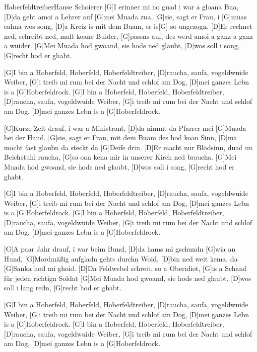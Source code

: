 \documentclass[../main.tex]{subfiles}
\begin{document}
\begin{song}{Haberfeldtreiber}{Hanse Schoierer}{}
[G]I erinner mi no guad i war a gloana Bua, [D]da geht amoi a Lehrer auf [G]mei Muada zua,
[G]sie, sagt er Frau, i [G]muas eahna wos song, [D]a Kreiz is mit dem Buam, er is[G] so ungezogn.
[D]Er rechnet ned, schreibt ned, malt koane Buider, [G]passns auf, des werd amoi a ganz a ganz a wuider.
[G]Mei Muada hod gwoand, sie hods ned glaubt, [D]wos soll i song, [G]recht hod er ghabt.

[G]I bin a Hoberfeld, Hoberfeld, Hoberfeldtreiber, [D]raucha, saufa, vogeldwuide Weiber,
[G]i treib mi rum bei der Nacht und schlof am Dog, [D]mei ganzes Lebn is a [G]Hoberfeldrock.
[G]I bin a Hoberfeld, Hoberfeld, Hoberfeldtreiber, [D]raucha, saufa, vogeldwuide Weiber,
[G]i treib mi rum bei der Nacht und schlof am Dog, [D]mei ganzes Lebn is a [G]Hoberfeldrock.

[G]Kurze Zeit drauf, i war a Ministrant, [D]da nimmt da Pfarrer mei [G]Muada bei der Hand,
[G]sie, sagt er Frau, mit dem Buam des hod koan Sinn, [D]ma möcht fast glaubn da steckt da [G]Deife drin.
[D]Er macht nur Blödsinn, duad im Beichstuhl raucha, [G]so oan kena mir in unserer Kirch ned braucha.
[G]Mei Muada hod gwoand, sie hods ned glaubt, [D]wos soll i song, [G]recht hod er ghabt.

[G]I bin a Hoberfeld, Hoberfeld, Hoberfeldtreiber, [D]raucha, saufa, vogeldwuide Weiber,
[G]i treib mi rum bei der Nacht und schlof am Dog, [D]mei ganzes Lebn is a [G]Hoberfeldrock.
[G]I bin a Hoberfeld, Hoberfeld, Hoberfeldtreiber, [D]raucha, saufa, vogeldwuide Weiber,
[G]i treib mi rum bei der Nacht und schlof am Dog, [D]mei ganzes Lebn is a [G]Hoberfeldrock.

[G]A paar Jahr drauf, i war beim Bund, [D]da hams mi gschundn [G]wia an Hund,
[G]Mordmäßig aufgladn gehts durchn Woid, [D]bin ned weit kema, da [G]Sanka hod mi ghoid.
[D]Da Feldwebel schreit, \glqq{}so a Oberidiot, [G]is a Schand für jeden richtign Soldat\grqq{}
[G]Mei Muada hod gwoand, sie hods ned glaubt, [D]wos soll i lang redn, [G]recht hod er ghabt.

[G]I bin a Hoberfeld, Hoberfeld, Hoberfeldtreiber, [D]raucha, saufa, vogeldwuide Weiber,
[G]i treib mi rum bei der Nacht und schlof am Dog, [D]mei ganzes Lebn is a [G]Hoberfeldrock.
[G]I bin a Hoberfeld, Hoberfeld, Hoberfeldtreiber, [D]raucha, saufa, vogeldwuide Weiber,
[G]i treib mi rum bei der Nacht und schlof am Dog, [D]mei ganzes Lebn is a [G]Hoberfeldrock.
\end{song}
\end{document}
